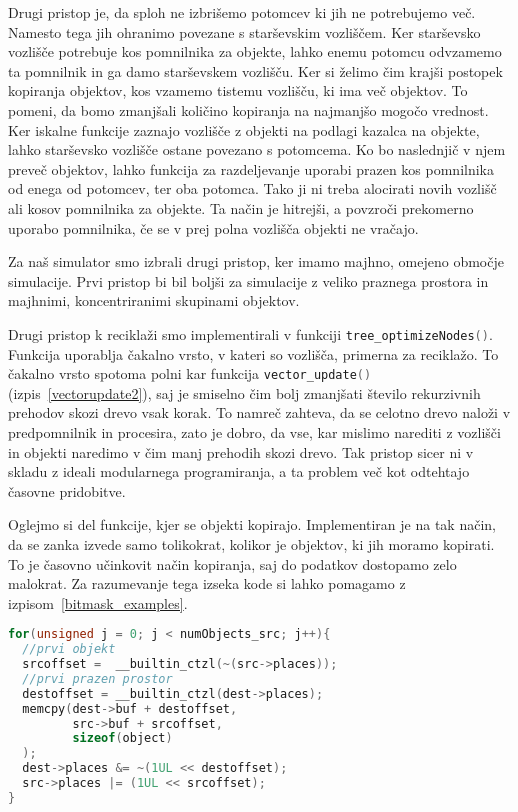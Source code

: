 \documentclass[a4paper,12pt]{article}
\begin{document}
Drugi pristop je, da sploh ne izbrišemo potomcev ki jih ne potrebujemo več. Namesto tega jih ohranimo povezane s
starševskim vozliščem. Ker starševsko vozlišče potrebuje kos pomnilnika za objekte, lahko enemu potomcu odvzamemo
ta pomnilnik in ga damo starševskem vozlišču. Ker si želimo čim krajši postopek kopiranja objektov, kos vzamemo tistemu vozlišču,
ki ima več objektov. To pomeni, da bomo zmanjšali količino kopiranja na najmanjšo mogočo vrednost. Ker iskalne funkcije
zaznajo vozlišče z objekti na podlagi kazalca na objekte, lahko starševsko vozlišče ostane povezano s potomcema.
Ko bo naslednjič v njem preveč objektov, lahko funkcija za razdeljevanje uporabi prazen kos pomnilnika od enega
od potomcev, ter oba potomca. Tako ji ni treba alocirati novih vozlišč ali kosov pomnilnika za objekte.
Ta način je hitrejši, a povzroči prekomerno uporabo pomnilnika, če se v prej polna vozlišča objekti ne vračajo.

Za naš simulator smo izbrali drugi pristop, ker imamo majhno, omejeno območje simulacije. Prvi pristop bi bil
boljši za simulacije z veliko praznega prostora in majhnimi, koncentriranimi skupinami objektov.

Drugi pristop k reciklaži smo implementirali v funkciji \lstinline[language=C]{tree_optimizeNodes()}.
Funkcija uporablja čakalno vrsto, v kateri so vozlišča, primerna za reciklažo. To čakalno vrsto spotoma polni
kar funkcija \lstinline[language=C]{vector_update()} (izpis~\ref{vectorupdate2}), saj je smiselno čim bolj zmanjšati število rekurzivnih
prehodov skozi drevo vsak korak. To namreč zahteva, da se celotno drevo naloži v predpomnilnik in procesira,
zato je dobro, da vse, kar mislimo narediti z vozlišči in objekti naredimo v čim manj prehodih skozi drevo.
Tak pristop sicer ni v skladu z ideali modularnega programiranja, a ta problem več kot odtehtajo časovne pridobitve.

Oglejmo si del funkcije, kjer se objekti kopirajo. Implementiran je na tak način, da se zanka izvede samo tolikokrat,
kolikor je objektov, ki jih moramo kopirati. To je časovno učinkovit način kopiranja, saj do podatkov dostopamo zelo
malokrat. Za razumevanje tega izseka kode si lahko pomagamo z izpisom~\ref{bitmask_examples}.
\begin{lstlisting}[caption={tree\_optimizeNodes() -- Kopiranje objektov}, label=optimizenodes, language=C]
for(unsigned j = 0; j < numObjects_src; j++){
  //prvi objekt
  srcoffset =  __builtin_ctzl(~(src->places));
  //prvi prazen prostor
  destoffset = __builtin_ctzl(dest->places);
  memcpy(dest->buf + destoffset,
         src->buf + srcoffset,
         sizeof(object)
  );
  dest->places &= ~(1UL << destoffset);
  src->places |= (1UL << srcoffset);
}
\end{lstlisting}
\newpage
\end{document}
